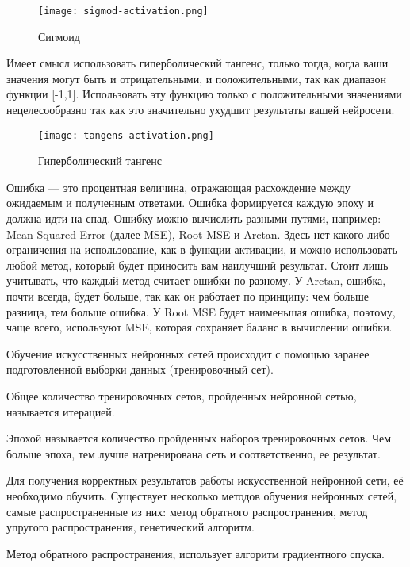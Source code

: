 \begin{figure}[!ht]
  \centering
  \texttt{[image: sigmod-activation.png]} 
  \caption{Сигмоид}
  \label{fig:analysis:sigmod-activation}
\end{figure}

Имеет смысл использовать гиперболический тангенс, только тогда, когда ваши значения могут быть и отрицательными, и
положительными, так как диапазон функции [-1,1]. Использовать эту функцию только с положительными значениями
нецелесообразно так как это значительно ухудшит результаты вашей нейросети.

\begin{figure}[!ht]
  \centering
  \texttt{[image: tangens-activation.png]} 
  \caption{Гиперболический тангенс}
  \label{fig:analysis:tangens-activation}
\end{figure}

Ошибка — это процентная величина, отражающая расхождение между ожидаемым и полученным ответами. Ошибка формируется
каждую эпоху и должна идти на спад. Ошибку можно вычислить разными путями, например:
Mean Squared Error (далее MSE), Root MSE и Arctan.
Здесь нет какого-либо ограничения на использование, как в функции активации, и можно использовать любой метод, который
будет приносить вам наилучший результат. Стоит лишь учитывать, что каждый метод считает ошибки по разному.
У Arctan, ошибка, почти всегда, будет больше, так как он работает по принципу: чем больше разница, тем больше ошибка.
У Root MSE будет наименьшая ошибка, поэтому, чаще всего, используют MSE, которая сохраняет баланс в вычислении ошибки.

Обучение искусственных нейронных сетей происходит с помощью заранее подготовленной выборки данных (тренировочный сет).

Общее количество тренировочных сетов, пройденных нейронной сетью, называется итерацией.

Эпохой называется количество пройденных наборов тренировочных \linebreak сетов. Чем больше эпоха, тем лучше натренирована сеть и
соответственно, ее результат.

Для получения корректных результатов работы искусственной нейронной сети, её необходимо обучить. Существует несколько
методов обучения нейронных сетей, самые распространенные из них: метод обратного распространения,
метод упругого распространения, генетический алгоритм.

Метод обратного распространения, использует алгоритм градиентного спуска.

